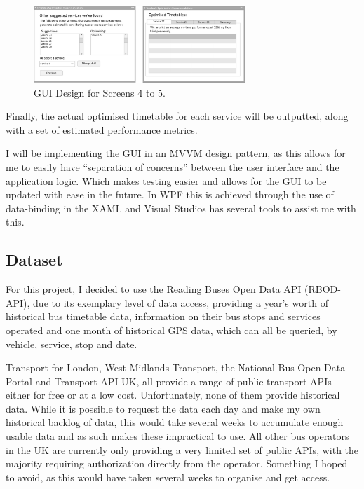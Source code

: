 \documentclass{article}
\begin{document}
\begin{figure}[H]
	\centering
	\includegraphics[height=110px]{images/GUI_2.png}
	\caption{GUI Design for Screens 4 to 5.}
	\label{fig:gui2}
\end{figure}

Finally, the actual optimised timetable for each service will be outputted, along with a set of estimated performance metrics. 

\par 
I will be implementing the GUI in an MVVM design pattern\cite{RN44}, as this allows for me to easily have ``separation of concerns'' between the user interface and the application logic. Which makes testing easier and allows for the GUI to be updated with ease in the future. In WPF this is achieved through the use of data-binding in the XAML and Visual Studios has several tools to assist me with this.


\subsection{Dataset}
For this project, I decided to use the Reading Buses Open Data API (RBOD-API), due to its exemplary level of data access, providing a year's worth of historical bus timetable data, information on their bus stops and services operated and one month of historical GPS data, which can all be queried, by vehicle, service, stop and date. 

\par
Transport for London, West Midlands Transport, the National Bus Open Data Portal and Transport API UK, all provide a range of public transport APIs either for free or at a low cost. Unfortunately, none of them provide historical data. While it is possible to request the data each day and make my own historical backlog of data, this would take several weeks to accumulate enough usable data and as such makes these impractical to use. All other bus operators in the UK are currently only providing a very limited set of public APIs, with the majority requiring authorization directly from the operator. Something I hoped to avoid, as this would have taken several weeks to organise and get access. 
\end{document}
